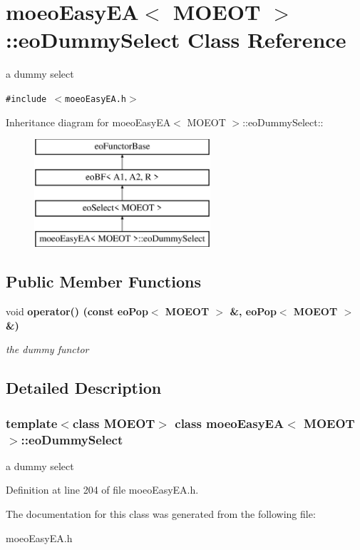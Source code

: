 \section{moeo\-Easy\-EA$<$ MOEOT $>$::eo\-Dummy\-Select Class Reference}
\label{classmoeoEasyEA_1_1eoDummySelect}
a dummy select  


{\tt \#include $<$moeo\-Easy\-EA.h$>$}

Inheritance diagram for moeo\-Easy\-EA$<$ MOEOT $>$::eo\-Dummy\-Select::\begin{figure}[H]
\begin{center}
\leavevmode
\includegraphics[height=4cm]{classmoeoEasyEA_1_1eoDummySelect}
\end{center}
\end{figure}
\subsection*{Public Member Functions}
\begin{CompactItemize}
\item 
void \bf{operator()} (const \bf{eo\-Pop}$<$ MOEOT $>$ \&, \bf{eo\-Pop}$<$ MOEOT $>$ \&)\label{classmoeoEasyEA_1_1eoDummySelect_32207d2ed997aa90ba9f32f5625b63d6}

\begin{CompactList}\small\item\em the dummy functor \item\end{CompactList}\end{CompactItemize}


\subsection{Detailed Description}
\subsubsection*{template$<$class MOEOT$>$ class moeo\-Easy\-EA$<$ MOEOT $>$::eo\-Dummy\-Select}

a dummy select 



Definition at line 204 of file moeo\-Easy\-EA.h.

The documentation for this class was generated from the following file:\begin{CompactItemize}
\item 
moeo\-Easy\-EA.h\end{CompactItemize}

